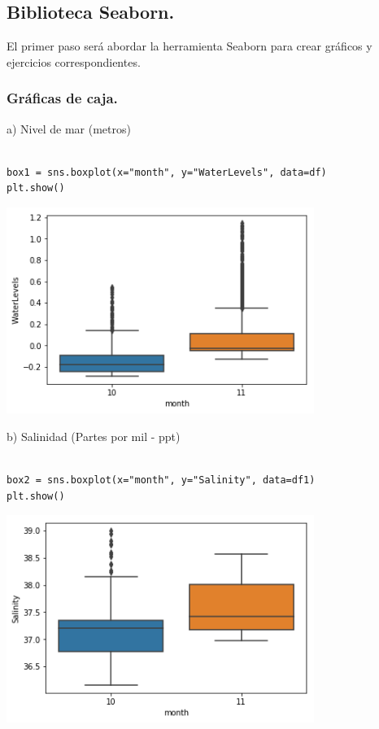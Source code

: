 \documentclass{article} %
\begin{document}
\subsection{Biblioteca Seaborn.}

El primer paso será abordar la herramienta Seaborn para crear gráficos y ejercicios correspondientes. 

\subsubsection{Gráficas de caja.}

\hspace{0.45 cm}a) Nivel de mar (metros)

\begin{verbatim} 

box1 = sns.boxplot(x="month", y="WaterLevels", data=df)
plt.show()

\end{verbatim}


 \begin{center}
 	\includegraphics[width=10cm]{box1.png}
 \end{center}


b) Salinidad (Partes por mil - ppt)


\begin{verbatim} 

box2 = sns.boxplot(x="month", y="Salinity", data=df1)
plt.show()

\end{verbatim}


 \begin{center}
 	\includegraphics[width=10cm]{box2.png}
 \end{center}
 
\end{document}
